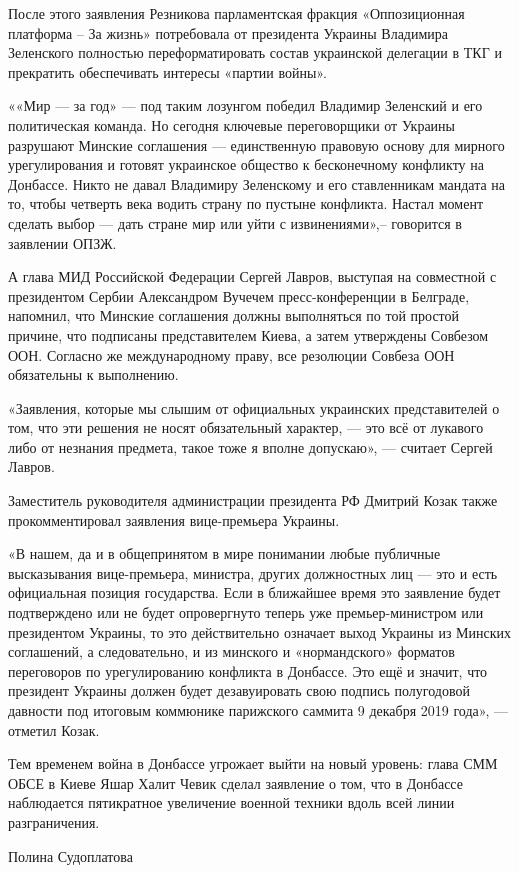 После этого заявления Резникова парламентская фракция «Оппозиционная платформа
– За жизнь» потребовала от президента Украины Владимира Зеленского полностью
переформатировать состав украинской делегации в ТКГ и прекратить обеспечивать
интересы «партии войны».

««Мир --- за год» --- под таким лозунгом победил Владимир Зеленский и его
политическая команда. Но сегодня ключевые переговорщики от Украины разрушают
Минские соглашения --- единственную правовую основу для мирного урегулирования и
готовят украинское общество к бесконечному конфликту на Донбассе. Никто не
давал Владимиру Зеленскому и его ставленникам мандата на то, чтобы четверть
века водить страну по пустыне конфликта. Настал момент сделать выбор --- дать
стране мир или уйти с извинениями»,– говорится в заявлении ОПЗЖ.

А глава МИД Российской Федерации Сергей Лавров, выступая на совместной с
президентом Сербии Александром Вучечем пресс-конференции в Белграде, напомнил,
что Минские соглашения должны выполняться по той простой причине, что подписаны
представителем Киева, а затем утверждены Совбезом ООН. Согласно же
международному праву, все резолюции Совбеза ООН обязательны к выполнению.

«Заявления, которые мы слышим от официальных украинских представителей о том,
что эти решения не носят обязательный характер, --- это всё от лукавого либо от
незнания предмета, такое тоже я вполне допускаю», --- считает Сергей Лавров.

Заместитель руководителя администрации президента РФ Дмитрий Козак также
прокомментировал заявления вице-премьера Украины.

«В нашем, да и в общепринятом в мире понимании любые публичные высказывания
вице-премьера, министра, других должностных лиц --- это и есть официальная
позиция государства. Если в ближайшее время это заявление будет подтверждено
или не будет опровергнуто теперь уже премьер-министром или президентом Украины,
то это действительно означает выход Украины из Минских соглашений, а
следовательно, и из минского и «нормандского» форматов переговоров по
урегулированию конфликта в Донбассе. Это ещё и значит, что президент Украины
должен будет дезавуировать свою подпись полугодовой давности под итоговым
коммюнике парижского саммита 9 декабря 2019 года», --- отметил Козак.

Тем временем война в Донбассе угрожает выйти на новый уровень: глава СММ ОБСЕ в
Киеве Яшар Халит Чевик сделал заявление о том, что в Донбассе наблюдается
пятикратное увеличение военной техники вдоль всей линии разграничения.

Полина Судоплатова
  

